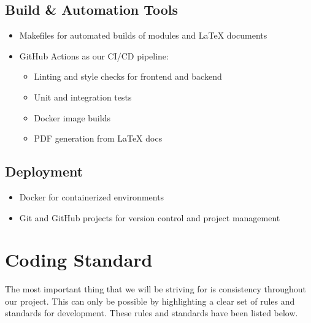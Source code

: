 \documentclass{article}
\begin{document}
\subsection*{Build \& Automation Tools}
\begin{itemize}
    \item Makefiles for automated builds of modules and LaTeX documents
    \item GitHub Actions as our CI/CD pipeline:
    \begin{itemize}
        \item Linting and style checks for frontend and backend
        \item Unit and integration tests
        \item Docker image builds
        \item PDF generation from LaTeX docs
    \end{itemize}
\end{itemize}

\subsection*{Deployment}
\begin{itemize}
    \item Docker for containerized environments
    \item Git and GitHub projects for version control and project management
\end{itemize}

\section{Coding Standard}

\noindent The most important thing that we will be striving for is consistency throughout our project. This can only be possible by highlighting a clear set of rules and standards for development. These rules and standards have been listed below.
\end{document}
